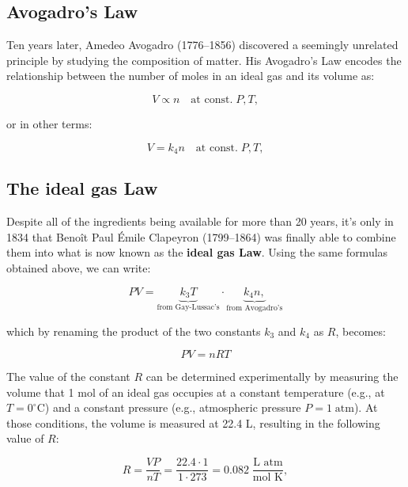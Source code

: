 \documentclass[
  9pt,
]{extbook}
\theoremstyle{definition}
\theoremstyle{definition}
\theoremstyle{definition}
\theoremstyle{definition}
\theoremstyle{remark}
\begin{document}
\subsection{Avogadro's Law}\label{avogadros-law}

Ten years later, Amedeo Avogadro (1776--1856) discovered a seemingly unrelated principle by studying the composition of matter. His Avogadro's Law encodes the relationship between the number of moles in an ideal gas and its volume as:

\begin{equation}
V\propto n\quad\text{at const.}\;P,T,
\label{eq:avogadrolaw1}
\end{equation}

or in other terms:

\begin{equation}
V=k_4 n\quad\text{at const.}\;P,T,
\label{eq:avogadrolaw2}
\end{equation}

\subsection{The ideal gas Law}\label{the-ideal-gas-law}

Despite all of the ingredients being available for more than 20 years, it's only in 1834 that Benoît Paul Émile Clapeyron (1799--1864) was finally able to combine them into what is now known as the \textbf{ideal gas Law}. Using the same formulas obtained above, we can write:

\begin{equation}
PV=\underbrace{k_3 T}_{\text{from Gay-Lussac's}} \cdot \underbrace{k_4 n,}_{\text{from Avogadro's}}
\label{eq:ideallaw1}
\end{equation}

which by renaming the product of the two constants \(k_3\) and \(k_4\) as \(R\), becomes:

\begin{equation}
PV=nRT
\label{eq:ideallaw2}
\end{equation}

The value of the constant \(R\) can be determined experimentally by measuring the volume that 1 mol of an ideal gas occupies at a constant temperature (e.g., at \(T=0^\circ\mathrm{C}\)) and a constant pressure (e.g., atmospheric pressure \(P=1\;\mathrm{atm}\)). At those conditions, the volume is measured at 22.4 L, resulting in the following value of \(R\):

\begin{equation}
R=\frac{VP}{nT}=\frac{22.4 \cdot 1}{1 \cdot 273}=0.082 \;\frac{\text{L atm}}{\text{mol K}},
\label{eq:ideallaw3}
\end{equation}
\end{document}
